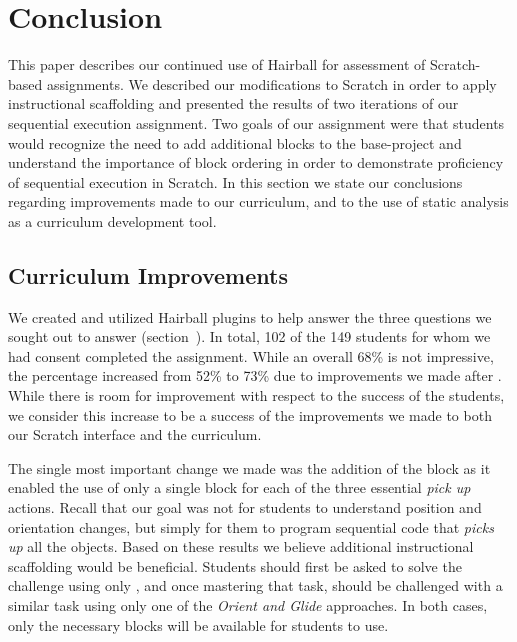 \section{Conclusion} 
This paper describes our continued use of Hairball for assessment of
Scratch-based assignments. We described our modifications to Scratch in order
to apply instructional scaffolding and presented the results of two iterations
of our sequential execution assignment. Two goals of our assignment were that
students would recognize the need to add additional blocks to the base-project
and understand the importance of block ordering in order to demonstrate
proficiency of sequential execution in Scratch. In this section we state our
conclusions regarding improvements made to our curriculum, and to the use of
static analysis as a curriculum development tool.

\subsection{Curriculum Improvements}
We created and utilized Hairball plugins to help answer the three questions we
sought out to answer (section~). In total, 102 of the 149
students for whom we had consent completed the assignment. While an overall
68\% is not impressive, the percentage increased from 52\% to 73\% due to
improvements we made after \sone{}. While there is room for improvement with
respect to the success of the students, we consider this increase to be a
success of the improvements we made to both our Scratch interface and the
curriculum.

The single most important change we made was the addition of the \glideto{}
block as it enabled the use of only a single block for each of the three
essential \emph{pick up} actions. Recall that our goal was not for students to
understand position and orientation changes, but simply for them to program
sequential code that \emph{picks up} all the objects. Based on these results we
believe additional instructional scaffolding would be beneficial. Students
should first be asked to solve the challenge using only \glideto{}, and once
mastering that task, should be challenged with a similar task using only one of
the \emph{Orient and Glide} approaches. In both cases, only the necessary
blocks will be available for students to use.

